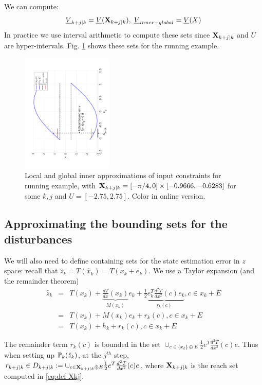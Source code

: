 We can compute:
\begin{equation}
\label{eq:Vkj Vmax}
\underline{V}_{k+j|k}  = \underline{V}(\mathbf{X}_{k+j|k}), \; \underline{V}_{inner-global} = \underline{V}(X)
\end{equation}
In practice we use interval arithmetic to compute these sets since $\mathbf{X}_{k+j|k}$ and $U$ are hyper-intervals.
Fig. \ref{fig:err bounds toy} shows these sets for the running example.
\begin{figure}
	\centering
	\includegraphics[angle=270,width=0.39\textwidth]{figs/InputToy.pdf}
	\caption{Local and global inner approximations of input constraints for running example, with $\mathbf{X}_{k+j|k} =  [-\pi/4,0]\times[-0.9666,-0.6283]$ for some $k,j$ and $U = [-2.75,2.75]$. Color in online version.}
	\label{fig:err bounds toy}
\end{figure}


\subsection{Approximating the bounding sets for the disturbances}
\label{sec:approx dist}
We will also need to define containing sets for the state estimation error in $z$ space:
recall that $\hat{z}_k = T(\hat{x}_k) = T(x_k+e_k)$. 
We use a Taylor expansion (and the remainder theorem)
\begin{eqnarray}
\label{eq:taylor expansion T}
\hat{z}_k &=& T(x_k) + \underbrace{\frac{dT}{dx}(x_k)}_{M(x_k)}e_k+ \underbrace{\frac{1}{2}e_k^T \frac{d^2T}{dx^2}(c)e_k}_{r_k(c)}, c \in x_k + E \nonumber 
\\
&=& T(x_k) + M(x_k)e_k+ r_k(c), c \in x_k + E \nonumber
\\
&=& T(x_k) + h_{k}+ r_k(c), c \in x_k + E \nonumber
\end{eqnarray}

The remainder term $r_k(c)$ is bounded in the set $\cup_{c \in \{x_k\} \oplus  E}   \frac{1}{2}e^T\frac{d^2T}{dx^2}(c)e$.
Thus when setting up $\mathbb{P}_{k}(\hat{z}_{k})$, at the $j^{th}$ step, 
$r_{k+j|k} \in D_{k+j|k} := \cup_{c \in \mathbf{X}_{k+j|k} \oplus  E}   \frac{1}{2}e^T\frac{d^2T}{dx^2}(c)e $,
where $\mathbf{X}_{k+j|k}$ is the reach set computed in \eqref{eq:def Xkj}.

